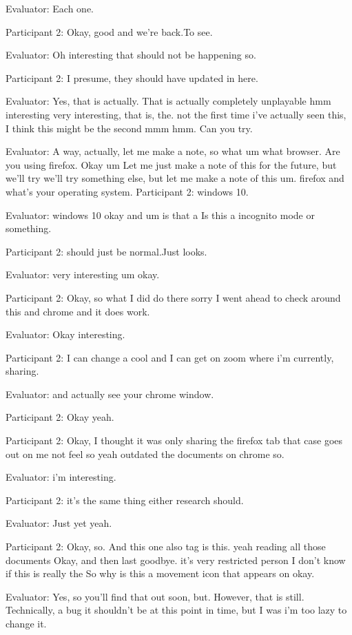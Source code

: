 \documentclass{l4proj}
\begin{document}
\begin{appendices}
Evaluator: Each one.

Participant 2: Okay, good and we're back.To see.

Evaluator: Oh interesting that should not be happening so.

Participant 2: I presume, they should have updated in here.

Evaluator: Yes, that is actually. That is actually completely unplayable hmm interesting very interesting, that is, the. not the first time i've actually seen this, I think this might be the second mmm hmm. Can you try.

Evaluator: A way, actually, let me make a note, so what um what browser. Are you using firefox. Okay um Let me just make a note of this for the future, but we'll try we'll try something else, but let me make a note of this um. firefox and what's your operating system.
Participant 2: windows 10.

Evaluator: windows 10 okay and um is that a Is this a incognito mode or something.

Participant 2: should just be normal.Just looks.

Evaluator: very interesting um okay.

Participant 2: Okay, so what I did do there sorry I went ahead to check around this and chrome and it does work.

Evaluator: Okay interesting.

Participant 2: I can change a cool and I can get on zoom where i'm currently, sharing.

Evaluator: and actually see your chrome window.

Participant 2: Okay yeah.

Participant 2: Okay, I thought it was only sharing the firefox tab that case goes out on me not feel so yeah outdated the documents on chrome so.

Evaluator: i'm interesting.

Participant 2: it's the same thing either research should.

Evaluator: Just yet yeah.

Participant 2: Okay, so. And this one also tag is this. yeah reading all those documents Okay, and then last goodbye. it's very restricted person I don't know if this is really the So why is this a movement icon that appears on okay.

Evaluator: Yes, so you'll find that out soon, but. However, that is still. Technically, a bug it shouldn't be at this point in time, but I was i'm too lazy to change it.


\end{appendices}
\end{document}
